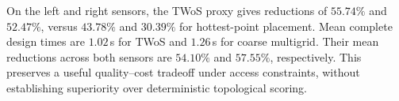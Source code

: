 On the left and right sensors, the TWoS proxy gives reductions of $55.74\%$ and $52.47\%$, versus $43.78\%$ and $30.39\%$ for hottest-point placement. Mean complete design times are $1.02$\,s for TWoS and $1.26$\,s for coarse multigrid. Their mean reductions across both sensors are $54.10\%$ and $57.55\%$, respectively. This preserves a useful quality--cost tradeoff under access constraints, without establishing superiority over deterministic topological scoring.
